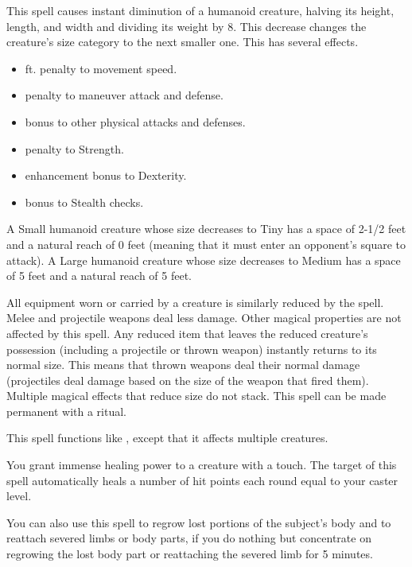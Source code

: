 \spelldur{\durshort \dismissable}
\spelleffect This spell causes instant diminution of a humanoid creature, halving its height, length, and width and dividing its weight by 8. This decrease changes the creature's size category to the next smaller one. This has several effects.
\begin{itemize} 
    \item {} ft. penalty to movement speed.
    \item {} penalty to maneuver attack and defense.
    \item {} bonus to other physical attacks and defenses.
    \item {} penalty to Strength.
    \item {} enhancement bonus to Dexterity.
    \item {} bonus to Stealth checks.
\end{itemize}
\par A Small humanoid creature whose size decreases to Tiny has a space of 2-1/2 feet and a natural reach of 0 feet (meaning that it must enter an opponent's square to attack). A Large humanoid creature whose size decreases to Medium has a space of 5 feet and a natural reach of 5 feet.
\par All equipment worn or carried by a creature is similarly reduced by the spell. Melee and projectile weapons deal less damage. Other magical properties are not affected by this spell. Any reduced item that leaves the reduced creature's possession (including a projectile or thrown weapon) instantly returns to its normal size. This means that thrown weapons deal their normal damage (projectiles deal damage based on the size of the weapon that fired them).
\spellnotes Multiple magical effects that reduce size do not stack. This spell can be made permanent with a  ritual.

\spelleffect This spell functions like , except that it affects multiple creatures.

\spelldur{\durshort}
\spelleffect You grant immense healing power to a creature with a touch. The target of this spell automatically heals a number of hit points each round equal to your caster level.
\par You can also use this spell to regrow lost portions of the subject's body and to reattach severed limbs or body parts, if you do nothing but concentrate on regrowing the lost body part or reattaching the severed limb for 5 minutes.

